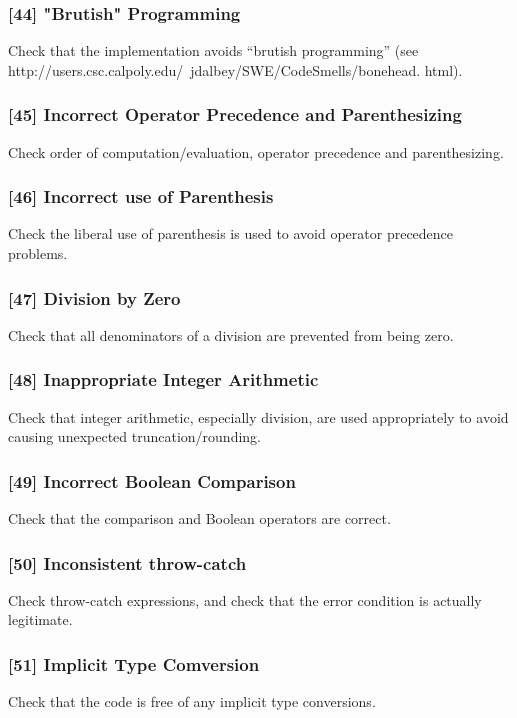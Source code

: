 \subsubsection{[44] "Brutish" Programming}
Check that the implementation avoids “brutish programming”
(see http://users.csc.calpoly.edu/~jdalbey/SWE/CodeSmells/bonehead. html).
\subsubsection{[45] Incorrect Operator Precedence and Parenthesizing}
Check order of computation/evaluation, operator precedence and parenthesizing.
\subsubsection{[46] Incorrect use of Parenthesis}
Check the liberal use of parenthesis is used to avoid operator precedence problems.
\subsubsection{[47] Division by Zero}
Check that all denominators of a division are prevented from being zero.
\subsubsection{[48] Inappropriate Integer Arithmetic}
Check that integer arithmetic, especially division, are used appropriately to avoid causing unexpected truncation/rounding.
\subsubsection{[49] Incorrect Boolean Comparison}
Check that the comparison and Boolean operators are correct.
\subsubsection{[50] Inconsistent throw-catch}
Check throw-catch expressions, and check that the error condition is actually legitimate.
\subsubsection{[51] Implicit Type Comversion}
Check that the code is free of any implicit type conversions.